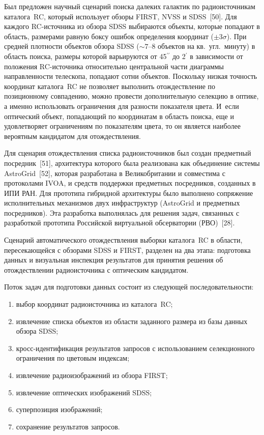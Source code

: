 \begin{multicols}{2}
      Был предложен научный сценарий поиска далеких галактик по радиоисточникам 
каталога~RC, который использует обзоры FIRST, NVSS и SDSS~[50]. Для каждого 
RC-ис\-точ\-ни\-ка из обзора SDSS выбираются объекты, которые попадают в область, 
размерами равную боксу ошибок определения координат ($\pm 3\sigma$). При средней 
плотности объектов обзора SDSS ($\sim7$--8 объектов на кв.\ угл.\ минуту) в область 
поиска, размеры которой варьируются от 45$^{\prime\prime}$ до 2$^\prime$ в зависимости 
от положения RC-ис\-точ\-ни\-ка относительно центральной части диаграммы 
направленности телескопа, попадают сотни объектов. Поскольку низкая точность координат 
каталога~RC не позволяет выполнить отождествление по позиционному совпадению, 
можно провести дополнительную селекцию в оптике, а именно использовать ограничения 
для разности показателя цвета. И~если оптический объект, попадающий по координатам в 
область поиска, еще и удовлетворяет ограничениям по показателям цвета, то он является 
наиболее вероятным кандидатом для отождествления. 

Для сценария отождествления списка радиоисточников был создан предметный 
посредник~[51], архитектура которого была реализована как объединение системы 
AstroGrid~[52], которая разработана в Великобритании и совместима с протоколами 
IVOA, и средств поддержки предметных посредников, созданных в ИПИ РАН. Для 
прототипа гиб\-рид\-ной архитектуры было выполнено сопряжение исполнительных 
механизмов двух инфраструктур (AstroGrid и предметных посредников). Эта разработка 
выполнялась для решения задач, связанных с разработкой прототипа Российской 
виртуальной обсерватории (РВО)~[28].
      
      Сценарий автоматического отождествления выборки каталога~RC в области, 
пересекающейся с обзорами SDSS и FIRST, разделен на два этапа: подготовка данных и 
визуальная инспекция результатов для принятия решения об отождествлении 
радиоисточника с оптическим кандидатом. 
      
      Поток задач для подготовки данных состоит из следующей последовательности: 
      \begin{enumerate}[(1)]
\item выбор координат радиоисточника из каталога~RC;
\item извлечение списка объектов из области заданного размера из базы данных обзора 
SDSS; 
\item кросс-идентификация результатов запросов с использованием селекционного 
ограничения по цветовым индексам; 
\item извлечение радиоизображений из обзора FIRST;
\item извлечение оптических изображений SDSS;
\item суперпозиция изображений;
\item сохранение результатов запросов. 
\end{enumerate}


\end{multicols}
